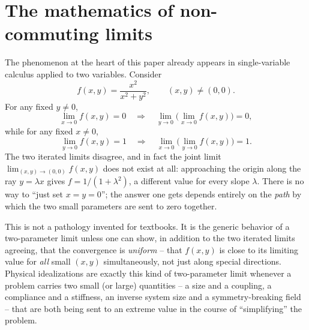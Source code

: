 \documentclass[11pt]{article}
\begin{document}
\section{The mathematics of non-commuting limits}

The phenomenon at the heart of this paper already appears in single-variable calculus applied to two variables. Consider
\begin{equation}
f(x,y) = \frac{x^2}{x^2+y^2}, \qquad (x,y)\neq(0,0).
\end{equation}
For any fixed $y\neq0$,
\begin{equation}
\lim_{x\to0} f(x,y) = 0 \quad\Longrightarrow\quad \lim_{y\to0}\Big(\lim_{x\to0}f(x,y)\Big) = 0,
\end{equation}
while for any fixed $x\neq0$,
\begin{equation}
\lim_{y\to0} f(x,y) = 1 \quad\Longrightarrow\quad \lim_{x\to0}\Big(\lim_{y\to0}f(x,y)\Big) = 1.
\end{equation}
The two iterated limits disagree, and in fact the joint limit $\lim_{(x,y)\to(0,0)}f(x,y)$ does not exist at all: approaching the origin along the ray $y=\lambda x$ gives $f = 1/(1+\lambda^2)$, a different value for every slope $\lambda$. There is no way to ``just set $x=y=0$''; the answer one gets depends entirely on the \emph{path} by which the two small parameters are sent to zero together.

This is not a pathology invented for textbooks. It is the generic behavior of a two-parameter limit unless one can show, in addition to the two iterated limits agreeing, that the convergence is \emph{uniform} -- that $f(x,y)$ is close to its limiting value for \emph{all} small $(x,y)$ simultaneously, not just along special directions. Physical idealizations are exactly this kind of two-parameter limit whenever a problem carries two small (or large) quantities -- a size and a coupling, a compliance and a stiffness, an inverse system size and a symmetry-breaking field -- that are both being sent to an extreme value in the course of ``simplifying'' the problem.
\end{document}
